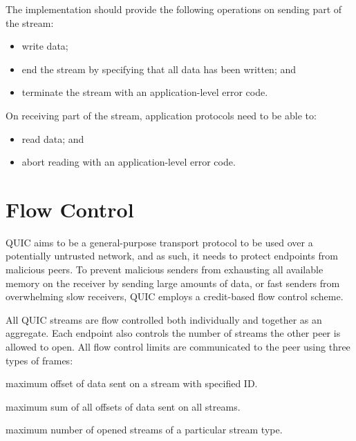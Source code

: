 The implementation should provide the following operations on sending part of the stream:

\begin{itemize}

  \item write data;

  \item end the stream by specifying that all data has been written; and

  \item terminate the stream with an application-level error code.

\end{itemize}

On receiving part of the stream, application protocols need to be able to:

\begin{itemize}

  \item read data; and

  \item abort reading with an application-level error code.

\end{itemize}

\section{Flow Control}

QUIC aims to be a general-purpose transport protocol to be used over a potentially untrusted
network, and as such, it needs to protect endpoints from malicious peers. To prevent malicious
senders from exhausting all available memory on the receiver by sending large amounts of data, or
fast senders from overwhelming slow receivers, QUIC employs a credit-based flow control scheme.

All QUIC streams are flow controlled both individually and together as an aggregate. Each endpoint
also controls the number of streams the other peer is allowed to open. All flow control limits are
communicated to the peer using three types of frames:

\begin{itemize}

\litem{\MAXSTREAMDATA{}} maximum offset of data sent on a stream with specified ID\@.

\litem{\MAXDATA{}} maximum sum of all offsets of data sent on all streams.

\litem{\MAXSTREAMS{}} maximum number of opened streams of a particular stream type.

\end{itemize}

